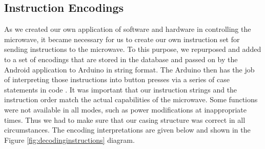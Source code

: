 \documentclass[10pt,journal,letterpaper,twocolumn]{IEEEtran}
\begin{document}
\subsection*{Instruction Encodings}
As we created our own application of software and hardware in controlling the microwave, it became necessary for us to create our own instruction set for sending instructions to the microwave.  To this purpose, we repurposed and added to a set of encodings that are stored in the database and passed on by the Android application to Arduino in string format.  The Arduino then has the job of interpreting those instructions into button presses via a series of case statements in code \cite{raspberryPicrowaveRepo}.  It was important that our instruction strings and the instruction order match the actual capabilities of the microwave.  Some functions were not available in all modes, such as power modifications at inappropriate times.  Thus we had to make sure that our casing structure was correct in all circumstances.  The encoding interpretations are given below and shown in the Figure  \ref{fig:decodinginstructions} diagram.
\end{document}
